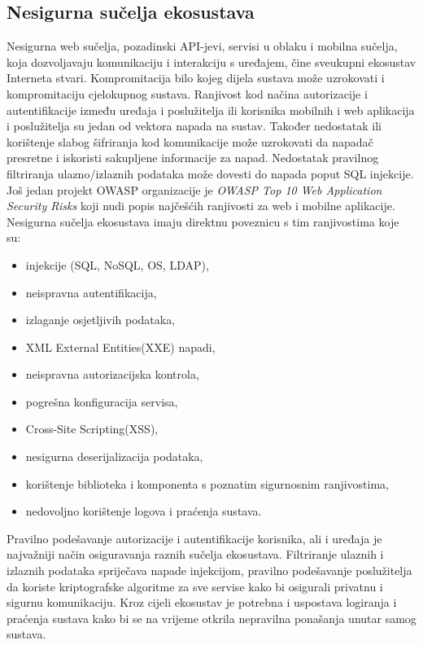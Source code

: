 \documentclass[times, utf8, diplomski]{fer}
\begin{document}
\subsection{Nesigurna sučelja ekosustava}
Nesigurna web sučelja, pozadinski API-jevi, servisi u oblaku i mobilna sučelja, koja dozvoljavaju komunikaciju i interakciju s uređajem, čine sveukupni ekosustav Interneta stvari. Kompromitacija bilo kojeg dijela sustava može uzrokovati i kompromitaciju cjelokupnog sustava. Ranjivost kod načina autorizacije i autentifikacije između uređaja i poslužitelja ili korisnika mobilnih i web aplikacija i poslužitelja su jedan od vektora napada na sustav. Također nedostatak ili korištenje slabog šifriranja kod komunikacije može uzrokovati da napadač presretne i iskoristi sakupljene informacije za napad. Nedostatak pravilnog filtriranja ulazno/izlaznih podataka može dovesti do napada poput SQL injekcije. Još jedan projekt OWASP organizacije je \emph{OWASP Top 10 Web Application Security Risks} koji nudi popis najčešćih ranjivosti za web i mobilne aplikacije. Nesigurna sučelja ekosustava imaju direktnu poveznicu s tim ranjivostima koje su: \begin{itemize}
    \item injekcije (SQL, NoSQL, OS, LDAP),
    \item neispravna autentifikacija,
    \item izlaganje osjetljivih podataka,
    \item XML External Entities(XXE) napadi,
    \item neispravna autorizacijska kontrola,
    \item pogrešna konfiguracija servisa,
    \item Cross-Site Scripting(XSS),
    \item nesigurna deserijalizacija podataka,
    \item korištenje biblioteka i komponenta s poznatim sigurnosnim ranjivostima,
    \item nedovoljno korištenje logova i praćenja sustava.\citep{owasp2}
\end{itemize}

Pravilno podešavanje autorizacije i autentifikacije korisnika, ali i uređaja je najvažniji način osiguravanja raznih sučelja ekosustava. Filtriranje ulaznih i izlaznih podataka spriječava napade injekcijom, pravilno podešavanje poslužitelja da koriste kriptografske algoritme za sve servise kako bi osigurali privatnu i sigurnu komunikaciju. Kroz cijeli ekosustav je potrebna i uspostava logiranja i praćenja sustava kako bi se na vrijeme otkrila nepravilna ponašanja unutar samog sustava.
\end{document}
